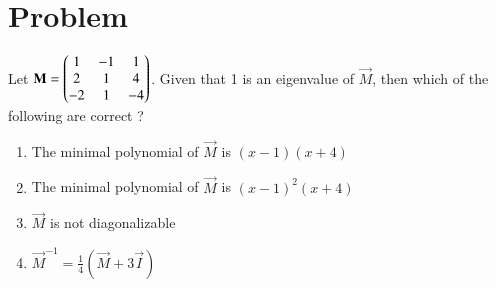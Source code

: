 \documentclass[journal,12pt]{IEEEtran}
\begin{document}
\section{\textbf{Problem}}
Let $\mathbf{M}=\begin{pmatrix}1 & -1 & 1\\2 & 1 & 4\\-2 & 1 & -4\end{pmatrix}$. Given that 1 is an eigenvalue of $\vec{M}$, then which of the following are correct ?
\begin{enumerate}
\item The minimal polynomial of $\vec{M}$ is $(x-1)(x+4)$  
\item The minimal polynomial of $\vec{M}$ is $(x-1)^2(x+4)$
\item $\vec{M}$ is not diagonalizable
\item $\vec{M}^{-1}=\frac{1}{4}(\vec{M}+3\vec{I})$
\end{enumerate}
\end{document}
